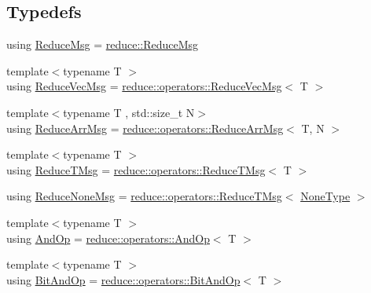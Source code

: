 \subsection*{Typedefs}
\begin{DoxyCompactItemize}
\item 
using \hyperlink{namespacevt_1_1collective_a4c5bf7769ad4396573d6bcc85ec430a4}{Reduce\+Msg} = \hyperlink{structvt_1_1collective_1_1reduce_1_1_reduce_msg}{reduce\+::\+Reduce\+Msg}
\item 
{\footnotesize template$<$typename T $>$ }\\using \hyperlink{namespacevt_1_1collective_a711b5dd8547fee4b63077f44188959f4}{Reduce\+Vec\+Msg} = \hyperlink{structvt_1_1collective_1_1reduce_1_1operators_1_1_reduce_vec_msg}{reduce\+::operators\+::\+Reduce\+Vec\+Msg}$<$ T $>$
\item 
{\footnotesize template$<$typename T , std\+::size\+\_\+t N$>$ }\\using \hyperlink{namespacevt_1_1collective_a12eddadcf360fcb9d05149e2d8aa327a}{Reduce\+Arr\+Msg} = \hyperlink{structvt_1_1collective_1_1reduce_1_1operators_1_1_reduce_arr_msg}{reduce\+::operators\+::\+Reduce\+Arr\+Msg}$<$ T, N $>$
\item 
{\footnotesize template$<$typename T $>$ }\\using \hyperlink{namespacevt_1_1collective_a28b82d5d48c9bc6e4fd738fcbf9e0f62}{Reduce\+T\+Msg} = \hyperlink{structvt_1_1collective_1_1reduce_1_1operators_1_1_reduce_t_msg}{reduce\+::operators\+::\+Reduce\+T\+Msg}$<$ T $>$
\item 
using \hyperlink{namespacevt_1_1collective_aa439a90f05078f2bcf918641c951946f}{Reduce\+None\+Msg} = \hyperlink{structvt_1_1collective_1_1reduce_1_1operators_1_1_reduce_t_msg}{reduce\+::operators\+::\+Reduce\+T\+Msg}$<$ \hyperlink{namespacevt_1_1collective_af988b64711231f96d33ebfaf891e52a4}{None\+Type} $>$
\item 
{\footnotesize template$<$typename T $>$ }\\using \hyperlink{namespacevt_1_1collective_ae6f54eb36ce2d4203174e55167c4cd87}{And\+Op} = \hyperlink{structvt_1_1collective_1_1reduce_1_1operators_1_1_and_op}{reduce\+::operators\+::\+And\+Op}$<$ T $>$
\item 
{\footnotesize template$<$typename T $>$ }\\using \hyperlink{namespacevt_1_1collective_a64c800cae2fcb4ec24d2c5540cca0f9e}{Bit\+And\+Op} = \hyperlink{structvt_1_1collective_1_1reduce_1_1operators_1_1_bit_and_op}{reduce\+::operators\+::\+Bit\+And\+Op}$<$ T $>$
\item 

\end{DoxyCompactItemize}
